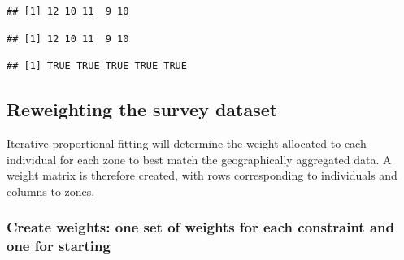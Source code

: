 \begin{verbatim}
## [1] 12 10 11  9 10
\end{verbatim}
\begin{Shaded}
\begin{Highlighting}[]
\NormalTok{(all.msim[,}\NormalTok{:}\NormalTok{]) }
\end{Highlighting}
\end{Shaded}
\begin{verbatim}
## [1] 12 10 11  9 10
\end{verbatim}
\begin{Shaded}
\begin{Highlighting}[]

\NormalTok{(all.msim[,}\NormalTok{:}\NormalTok{]) == }\NormalTok{(all.msim[,}\NormalTok{:}\NormalTok{]) }
\end{Highlighting}
\end{Shaded}
\begin{verbatim}
## [1] TRUE TRUE TRUE TRUE TRUE
\end{verbatim}
\begin{Shaded}
\begin{Highlighting}[]
\end{Highlighting}
\end{Shaded}
\subsection{Reweighting the survey dataset}

Iterative proportional fitting will determine the weight allocated to
each individual for each zone to best match the geographically
aggregated data. A weight matrix is therefore created, with rows
corresponding to individuals and columns to zones.

\subsubsection{Create weights: one set of weights for each constraint
and one for starting}

\begin{Shaded}
\begin{Highlighting}[]
\NormalTok{(} \NormalTok{(}
\NormalTok{(} \NormalTok{(}
\NormalTok{(} \NormalTok{(}

  
\end{Highlighting}
\end{Shaded}
